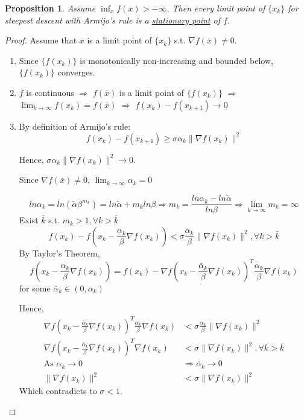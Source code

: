 \documentclass[11pt,a4paper]{article}
\newtheorem{proposition}{Proposition}
\begin{document}
\begin{proposition}
Assume $\inf_x f(x)>-\infty$. Then every limit point of $\{x_k\}$ for steepest descent with Armijo's rule is a \underline{stationary point} of $f$.
\end{proposition}
\begin{proof}
Assume that $\bar{x}$ is a limit point of $\{x_k\}$ s.t. $\nabla f(\bar{x})\neq 0$.
\begin{enumerate}[$\bullet$]
    \item Since $\{f(x_k)\}$ is monotonically non-increasing and bounded below, $\{f(x_k)\}$ converges.
    \item $f$ is continuous $\Rightarrow$ $f(\bar{x})$ is a limit point of $\{f(x_k)\}$ $\Rightarrow$ $\lim_{k \rightarrow \infty}f(x_k)=f(\bar{x})$ $\Rightarrow$ $f(x_k)-f(x_{k+1})\rightarrow 0$
    \item By definition of Armijo's rule: $$f(x_k)-f(x_{k+1})\geq \sigma\alpha_k\|\nabla f(x_k)\|^2$$
    
    Hence, $\sigma\alpha_k\|\nabla f(x_k)\|^2 \rightarrow 0$.

    Since $\nabla f(\bar{x})\neq 0$, $\lim_{k \rightarrow \infty}\alpha_k=0$

    $$ln\alpha_k=ln (\tilde{\alpha}\beta^{m_k})=ln\tilde{\alpha}+m_kln\beta \Rightarrow	m_k=\frac{ln\alpha_k-ln\tilde{\alpha}}{ln\beta}\Rightarrow \lim_{k \rightarrow \infty}m_k=\infty$$
    Exist $\bar{k}$ s.t. $m_k>1,\forall k>\bar{k}$
    $$f(x_k)-f(x_k-\frac{\alpha_k}{\beta}\nabla f(x_k))<\sigma\frac{\alpha_k}{\beta}\|\nabla f(x_k)\|^2,\forall k>\bar{k}$$
    By Taylor's Theorem,
    $$f(x_k-\frac{\alpha_k}{\beta}\nabla f(x_k))=f(x_k)-\nabla f(x_k-\frac{\bar{\alpha}_k}{\beta}\nabla f(x_k))^T\frac{\alpha_k}{\beta}\nabla f(x_k)$$ for some $\bar{\alpha}_k\in(0,\alpha_k)$

    Hence, \begin{equation}
        \begin{aligned}
            \nabla f(x_k-\frac{\bar{\alpha}_k}{\beta}\nabla f(x_k))^T\frac{\alpha_k}{\beta}\nabla f(x_k)&<\sigma\frac{\alpha_k}{\beta}\|\nabla f(x_k)\|^2\\
            \nabla f(x_k-\frac{\bar{\alpha}_k}{\beta}\nabla f(x_k))^T\nabla f(x_k)&<\sigma\|\nabla f(x_k)\|^2,
            \forall k>\bar{k}\\
            \text{As }\alpha_k \rightarrow 0& \Rightarrow \bar{\alpha}_k\rightarrow 0\\
            \|\nabla f(x_k)\|^2&<\sigma\|\nabla f(x_k)\|^2
        \end{aligned}
        \nonumber
    \end{equation}
    Which contradicts to $\sigma<1$.
\end{enumerate}
\end{proof}
\end{document}
